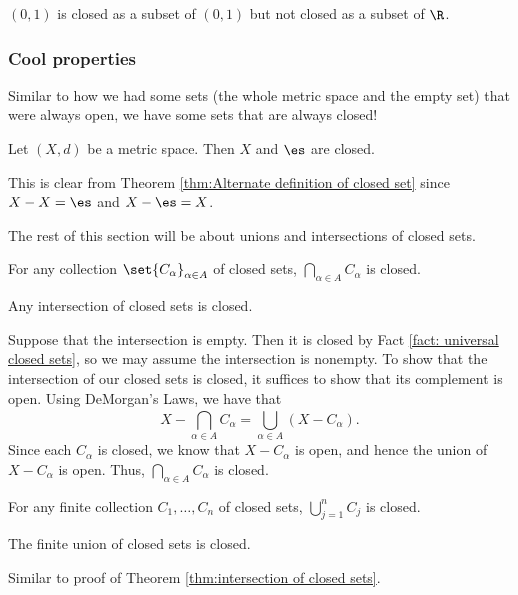 \documentclass[class=article, crop=false]{standalone}
\begin{document}
\begin{ex}
    $(0,1)$ is closed as a subset of $(0,1)$ but not closed as a subset of $\R$.
\end{ex}

\subsubsection*{Cool properties}

Similar to how we had some sets (the whole metric space and the empty set) that were always open, we have some sets that are always closed!
\begin{fact}{\label{fact: universal closed sets}}
    Let $(X,d)$ be a metric space. Then $X$ and $\es$ are closed.
\end{fact}
\begin{pf}
    This is clear from Theorem \ref{thm:Alternate definition of closed set} since $X-X = \es$ and $X - \es = X$.
\end{pf}

The rest of this section will be about unions and intersections of closed sets.

\begin{thm}{\label{thm:intersection of closed sets}}
    For any collection $\set{C_\alpha}_{\alpha \in A}$ of closed sets, $\bigcap_{\alpha \in A}^{} C_\alpha$ is closed.
\end{thm}
\begin{slogan}
    Any intersection of closed sets is closed.
\end{slogan}
\begin{pf}
    Suppose that the intersection is empty. Then it is closed by Fact \ref{fact: universal closed sets}, so we may assume the intersection is nonempty. To show that the intersection of our closed sets is closed, it suffices to show that its complement is open. Using DeMorgan's Laws, we have that
        \[
            X - \bigcap_{\alpha \in A}^{} C_\alpha = \bigcup_{\alpha \in A}^{} (X-C_\alpha).
        \]
    Since each $C_\alpha$ is closed, we know that $X - C_\alpha$ is open, and hence the union of $X- C_\alpha$ is open. Thus, $\bigcap_{\alpha \in A}^{} C_\alpha$ is closed.
\end{pf}

\begin{thm}
    For any finite collection $C_1, \ldots, C_n$ of closed sets, $\bigcup_{j=1}^{n} C_j$ is closed.
\end{thm}
\begin{slogan}
    The finite union of closed sets is closed.
\end{slogan}
\begin{pf}
    Similar to proof of Theorem \ref{thm:intersection of closed sets}.
\end{pf}
\end{document}
